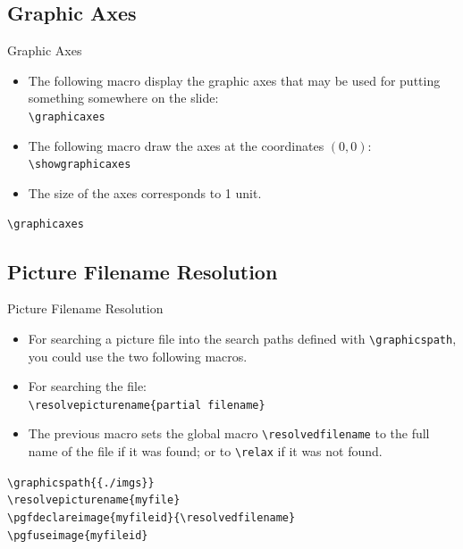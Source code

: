 \documentclass[english,sectioncirclenumberstyle]{ciadbeamer}
\begin{document}
\subsection{Graphic Axes}

\begin{frame}{Graphic Axes}
	\begin{itemize}
	\item The following macro display the graphic axes that may be used for putting something somewhere on the slide: \\
		\texttt{{\textbackslash}graphicaxes}
	\item The following macro draw the axes at the coordinates $(0,0)$: \\
		\texttt{{\textbackslash}showgraphicaxes}
	\item The size of the axes corresponds to 1 unit.
	\end{itemize}
	\begin{example}
		\texttt{{\textbackslash}graphicaxes}\\
		\graphicaxes
	\end{example}
\end{frame}

\subsection{Picture Filename Resolution}

\begin{frame}{Picture Filename Resolution}
	\begin{itemize}
	\item For searching a picture file into the search paths defined with \texttt{{\textbackslash}graphicspath}, you could use the two following macros.
	\item For searching the file: \\
		\texttt{{\textbackslash}resolvepicturename\{partial filename\}}
	\item The previous macro sets the global macro \texttt{{\textbackslash}resolvedfilename} to the full name of the file if it was found; or to \texttt{{\textbackslash}relax} if it was not found.
	\end{itemize}
	\begin{example}
		\texttt{{\textbackslash}graphicspath\{\{./imgs\}\}} \\
		\texttt{{\textbackslash}resolvepicturename\{myfile\}} \\
		\texttt{{\textbackslash}pgfdeclareimage\{myfileid\}\{{\textbackslash}resolvedfilename\}} \\
		\texttt{{\textbackslash}pgfuseimage\{myfileid\}} \\
	\end{example}
\end{frame}
\end{document}
